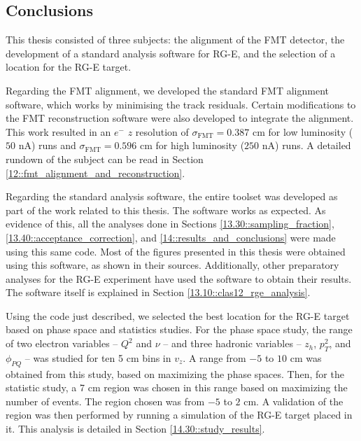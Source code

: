 \subsection{Conclusions}
\label{14.50::conclusions}
    This thesis consisted of three subjects: the alignment of the FMT detector, the development of a standard analysis software for RG-E, and the selection of a location for the RG-E target.

    Regarding the FMT alignment, we developed the standard FMT alignment software, which works by minimising the track residuals.
    Certain modifications to the FMT reconstruction software were also developed to integrate the alignment.
    This work resulted in an $e^-$ $z$ resolution of $\sigma_\text{FMT} = 0.387$ cm for low luminosity ($50$ nA) runs and $\sigma_\text{FMT} = 0.596$ cm for high luminosity ($250$ nA) runs.
    A detailed rundown of the subject can be read in Section \ref{12::fmt_alignment_and_reconstruction}.

    Regarding the standard analysis software, the entire toolset was developed as part of the work related to this thesis.
    The software works as expected.
    As evidence of this, all the analyses done in Sections \ref{13.30::sampling_fraction}, \ref{13.40::acceptance_correction}, and \ref{14::results_and_conclusions} were made using this same code.
    Most of the figures presented in this thesis were obtained using this software, as shown in their sources.
    Additionally, other preparatory analyses for the RG-E experiment have used the software to obtain their results.
    The software itself is explained in Section \ref{13.10::clas12_rge_analysis}.

    Using the code just described, we selected the best location for the RG-E target based on phase space and statistics studies.
    For the phase space study, the range of two electron variables -- $Q^2$ and $\nu$ -- and three hadronic variables -- $z_h$, $p_T^2$, and $\phi_{PQ}$ -- was studied for ten 5 cm bins in $v_z$.
    A range from $-5$ to $10$ cm was obtained from this study, based on maximizing the phase spaces.
    Then, for the statistic study, a 7 cm region was chosen in this range based on maximizing the number of events.
    The region chosen was from $-5$ to $2$ cm.
    A validation of the region was then performed by running a simulation of the RG-E target placed in it.
    This analysis is detailed in Section \ref{14.30::study_results}.

